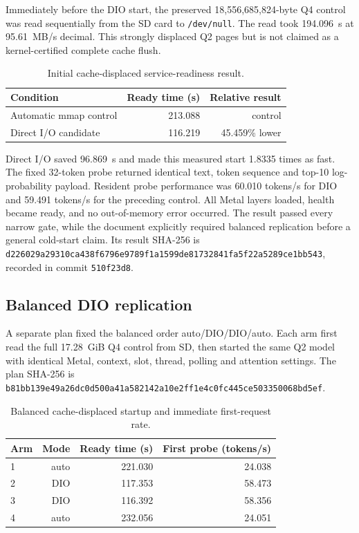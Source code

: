 Immediately before the DIO start, the preserved 18,556,685,824-byte Q4 control
was read sequentially from the SD card to \texttt{/dev/null}.  The read took
194.096~s at 95.61~MB/s decimal.  This strongly displaced Q2 pages but is not
claimed as a kernel-certified complete cache flush.

\begin{table}[ht]
\centering
\begin{tabular}{lrr}
\toprule
Condition & Ready time (s) & Relative result \\
\midrule
Automatic mmap control & 213.088 & control \\
Direct I/O candidate & 116.219 & 45.459\% lower \\
\bottomrule
\end{tabular}
\caption{Initial cache-displaced service-readiness result.}
\end{table}

Direct I/O saved 96.869~s and made this measured start 1.8335 times as fast.
The fixed 32-token probe returned identical text, token sequence and top-10
log-probability payload.  Resident probe performance was 60.010 tokens/s for
DIO and 59.491 tokens/s for the preceding control.  All Metal layers loaded,
health became ready, and no out-of-memory error occurred.  The result passed
every narrow gate, while the document explicitly required balanced
replication before a general cold-start claim.  Its result SHA-256 is
\texttt{d226029a29310ca438f6796e9789f1a1599de81732841fa5f22a5289ce1bb543},
recorded in commit \texttt{510f23d8}.

\subsection{Balanced DIO replication}

A separate plan fixed the balanced order auto/DIO/DIO/auto.  Each arm first
read the full 17.28~GiB Q4 control from SD, then started the same Q2 model with
identical Metal, context, slot, thread, polling and attention settings.  The
plan SHA-256 is
\texttt{b81bb139e49a26dc0d500a41a582142a10e2ff1e4c0fc445ce503350068bd5ef}.

\begin{table}[ht]
\centering
\begin{tabular}{lrrr}
\toprule
Arm & Mode & Ready time (s) & First probe (tokens/s) \\
\midrule
1 & auto & 221.030 & 24.038 \\
2 & DIO  & 117.353 & 58.473 \\
3 & DIO  & 116.392 & 58.356 \\
4 & auto & 232.056 & 24.051 \\
\bottomrule
\end{tabular}
\caption{Balanced cache-displaced startup and immediate first-request rate.}
\end{table}

